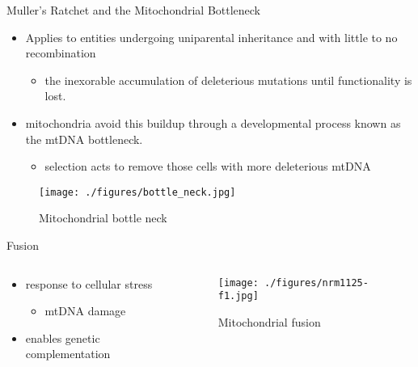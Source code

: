 \documentclass[presentation, smaller]{beamer}
\begin{document}
\begin{frame}[label={sec:orgabc120f}]{Muller's Ratchet and the Mitochondrial Bottleneck}
\begin{itemize}
\item Applies to entities undergoing uniparental inheritance and with little to no
recombination
\begin{itemize}
\item the inexorable accumulation of deleterious mutations until functionality
is lost.
\end{itemize}
\item mitochondria avoid this buildup through a developmental process
known as the mtDNA bottleneck. 
\begin{itemize}
\item selection acts to remove those cells with more deleterious mtDNA
\end{itemize}
\end{itemize}

\begin{figure}[htbp]
\centering
\texttt{[image: ./figures/bottle\_neck.jpg]}
\caption[bottle]{\label{fig:orgbc048b3}
Mitochondrial bottle neck}
\end{figure}
\end{frame}


\begin{frame}[label={sec:orgc0b06e9}]{Fusion}
\begin{columns}
\begin{column}{0.5\columnwidth}
\begin{itemize}
\item response to cellular stress
\begin{itemize}
\item mtDNA damage
\end{itemize}
\item enables genetic complementation
\end{itemize}
\end{column}

\begin{column}{0.5\columnwidth}
\begin{figure}[htbp]
\centering
\texttt{[image: ./figures/nrm1125-f1.jpg]}
\caption[fusion]{\label{fig:org4b91074}
Mitochondrial fusion}
\end{figure}
\end{column}
\end{columns}
\end{frame}
\end{document}
